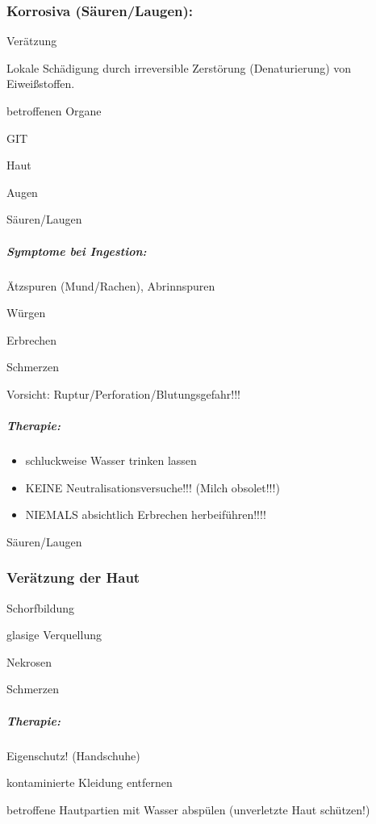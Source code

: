 \subsubsection{Korrosiva (Säuren/Laugen):}
{\mdseries
Verätzung}

{\mdseries
Lokale Schädigung durch irreversible Zerstörung (Denaturierung) von
Eiwei{\ss}stoffen. }

{\mdseries
betroffenen Organe}

{\mdseries
GIT}

{\mdseries
Haut}

{\mdseries
Augen}

{\mdseries
Säuren/Laugen}

\subparagraph{Symptome bei Ingestion:}
{\mdseries
\"Atzspuren (Mund/Rachen), Abrinnspuren}

{\mdseries
W\"urgen}

{\mdseries
Erbrechen}

{\mdseries
Schmerzen}

{\mdseries
Vorsicht: Ruptur/Perforation/Blutungsgefahr!!!}

\begin{gMassnahmenEnv}
\subparagraph*{Therapie:}

\begin{itemize}
\item schluckweise Wasser trinken lassen
\item KEINE Neutralisationsversuche!!! (Milch  obsolet!!!)
\item NIEMALS absichtlich Erbrechen  herbeif\"uhren!!!!
\end{itemize}
\end{gMassnahmenEnv}


{\mdseries
Säuren/Laugen}

\subsubsection{Verätzung der Haut}
{\mdseries
Schorfbildung}

{\mdseries
glasige Verquellung}

{\mdseries
Nekrosen}

{\mdseries
Schmerzen}

\subparagraph*{
Therapie:}

{\mdseries
Eigenschutz! (Handschuhe)}

{\mdseries
kontaminierte Kleidung entfernen}

{\mdseries
betroffene Hautpartien mit Wasser absp\"ulen  (unverletzte Haut
sch\"utzen!)}

